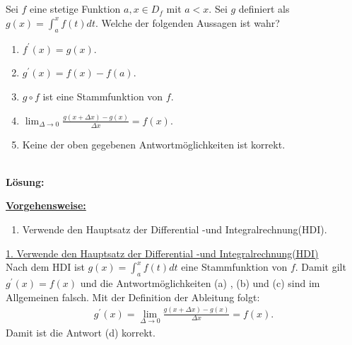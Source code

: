 \newpage

\subsection*{}
Sei $ f $ eine stetige Funktion $ a, x \in D_f $ mit $ a < x $.
Sei $ g $ definiert als $ g(x) = \int_a^x f(t) dt $.
Welche der folgenden Aussagen ist wahr?  
\renewcommand{\labelenumi}{(\alph{enumi})}
\begin{enumerate}
	\item 
	$ f^\prime(x) = g(x) $.
	\item
	$ g^\prime(x) = f(x) - f(a) $.
	\item
	$ g \circ f  $ ist eine Stammfunktion von $ f $.
	\item
	$ \lim_{\Delta \to 0} \frac{g(x+ \Delta x) - g(x)}{\Delta x} = f(x) $.
	\item
	Keine der oben gegebenen Antwortmöglichkeiten ist korrekt.
\end{enumerate}
\ \\
\textbf{Lösung:}
\begin{mdframed}
\underline{\textbf{Vorgehensweise:}}
\renewcommand{\labelenumi}{\theenumi.}
\begin{enumerate}
\item Verwende den Hauptsatz der Differential -und Integralrechnung(HDI).
\end{enumerate}
\end{mdframed}

\underline{1. Verwende den Hauptsatz der Differential -und Integralrechnung(HDI)}\\
Nach dem HDI ist $ g(x) = \int_a^x f(t) dt $ eine Stammfunktion von $ f $.
Damit gilt $ g^\prime(x) = f(x) $ und die Antwortmöglichkeiten (a) , (b) und (c) sind im Allgemeinen falsch.
Mit der Definition der Ableitung folgt:
\begin{align*}
	g^\prime(x) 
	=
	\lim\limits_{\Delta \to 0} \frac{g(x+ \Delta x) - g(x)}{\Delta x} 
	= f(x). 
\end{align*}
Damit ist die Antwort (d) korrekt.
 

\newpage
